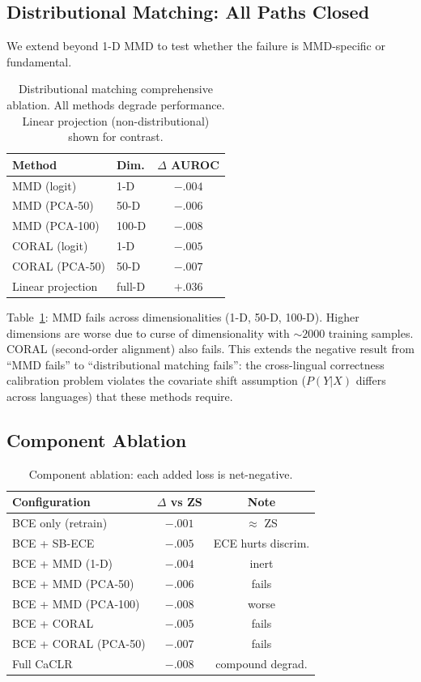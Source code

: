 \documentclass[11pt,a4paper]{article}
\begin{document}
\subsection{Distributional Matching: All Paths Closed}

We extend beyond 1-D MMD to test whether the failure is MMD-specific or fundamental.

\begin{table}[t]
\centering
\small
\caption{Distributional matching comprehensive ablation. All methods degrade performance. Linear projection (non-distributional) shown for contrast.}
\label{tab:distmatch}
\begin{tabular}{llc}
\toprule
Method & Dim. & $\Delta$ AUROC \\
\midrule
MMD (logit) & 1-D & $-.004$ \\
MMD (PCA-50) & 50-D & $-.006$ \\
MMD (PCA-100) & 100-D & $-.008$ \\
CORAL (logit) & 1-D & $-.005$ \\
CORAL (PCA-50) & 50-D & $-.007$ \\
\midrule
Linear projection & full-D & $+.036$ \\
\bottomrule
\end{tabular}
\end{table}

Table~\ref{tab:distmatch}: MMD fails across dimensionalities (1-D, 50-D, 100-D).
Higher dimensions are worse due to curse of dimensionality with ${\sim}2000$ training samples.
CORAL (second-order alignment) also fails.
This extends the negative result from ``MMD fails'' to ``distributional matching fails'': the cross-lingual correctness calibration problem violates the covariate shift assumption ($P(Y|X)$ differs across languages) that these methods require.

\subsection{Component Ablation}

\begin{table}[t]
\centering
\small
\caption{Component ablation: each added loss is net-negative.}
\label{tab:ablation}
\begin{tabular}{lcc}
\toprule
Configuration & $\Delta$ vs ZS & Note \\
\midrule
BCE only (retrain) & $-.001$ & $\approx$ ZS \\
BCE + SB-ECE & $-.005$ & ECE hurts discrim. \\
BCE + MMD (1-D) & $-.004$ & inert \\
BCE + MMD (PCA-50) & $-.006$ & fails \\
BCE + MMD (PCA-100) & $-.008$ & worse \\
BCE + CORAL & $-.005$ & fails \\
BCE + CORAL (PCA-50) & $-.007$ & fails \\
Full CaCLR & $-.008$ & compound degrad. \\
\bottomrule
\end{tabular}
\end{table}
\end{document}
